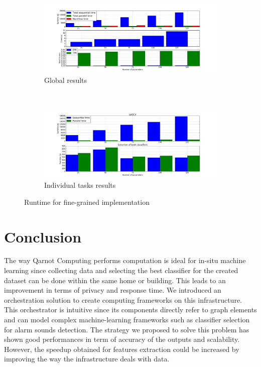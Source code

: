 \documentclass[10pt, conference, compsocconf]{IEEEtran}
\begin{document}
\begin{figure}[h]
  \begin{center}
    \begin{subfigure}{0.5\textwidth}
      \captionsetup{skip=0pt}
      \centering
      \includegraphics[width=\textwidth]{Figures/times_increasparams_global_bars.png}
      \caption{\footnotesize Global results \label{subfig:scalability_glob}}
  \end{subfigure} \\
  \begin{subfigure}{0.5\textwidth}
    \captionsetup{skip=0pt}
    \centering
    \includegraphics[width=\textwidth]{Figures/times_increasparams_individual_bars.png}
    \caption{\footnotesize Individual tasks results \label{subfig:scalability_ind}}
  \end{subfigure}
\end{center}
\caption{Runtime for fine-grained implementation \label{fig:scalability}}
\end{figure}
\section{Conclusion} \label{Conclusion}
The way Qarnot Computing performs computation is ideal for in-situ machine learning since collecting data and selecting the best classifier for the created dataset can be done within the same home or building. This leads to an improvement in terms of privacy and response time. We introduced an orchestration solution to create computing frameworks on this infrastructure. This orchestrator is intuitive since its components directly refer to graph elements and can model complex machine-learning frameworks such as classifier selection for alarm sounds detection. The strategy we proposed to solve this problem has shown good performances in term of accuracy of the outputs and scalability. However, the speedup obtained for features extraction could be increased by improving the way the infrastructure deals with data. 

\def\IEEEbibitemsep{1pt plus .5pt}






\end{document}
